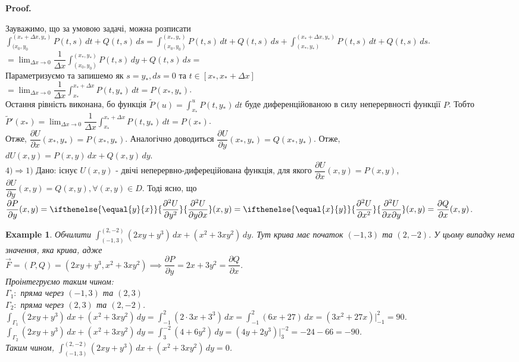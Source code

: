 \documentclass[a4paper, 10pt]{article}
\makeatletter
\def\departial#1#2{\dfrac{\partial {#1}}{\partial {#2}}}
\def\seconddepartial#1#2#3{\ifthenelse{\equal{#2}{#3}}{\dfrac{\partial^2 {#1}}{\partial {#2}^2}}{\dfrac{\partial^2 {#1}}{\partial {#2} \partial {#3}}}}
\def\qed{$\blacksquare$}
\theoremstyle{theoremdd}
\theoremstyle{theoremdd}
\theoremstyle{theoremdd}
\theoremstyle{theoremdd}
\theoremstyle{theoremdd}
\newtheorem{example}[theorem]{Example}
\theoremstyle{theoremdd}
\theoremstyle{theoremdd}
\theoremstyle{theoremdd}
\theoremstyle{theoremdd}
\theoremstyle{theoremdd}
\theoremstyle{theoremdd}
\theoremstyle{theoremdd}
\theoremstyle{theoremdd}
\theoremstyle{theoremdd}
\theoremstyle{theoremdd}
\renewenvironment{proof}[1][Proof.\\]{\par
\pushQED{\hfill \qed}%
\normalfont \topsep6\p@\@plus6\p@\relax
\trivlist
\item\relax
{\bfseries
#1\@addpunct{.}}\hspace\labelsep\ignorespaces
}{%
\popQED\endtrivlist\@endpefalse
}
\makeatother
\begin{document}
\begin{proof}
Зауважимо, що за умовою задачі, можна розписати \\ $\displaystyle\int_{(x_0,y_0}^{(x_*+\Delta x, y_*)}P(t,s)\,dt + Q(t,s)\,ds = \int_{(x_0,y_0)}^{(x_*, y_*)}P(t,s)\,dt + Q(t,s)\,ds + \int_{(x_*,y_*)}^{(x_*+\Delta x, y_*)}P(t,s)\,dt + Q(t,s)\,ds$.\\
$\boxed{=} \displaystyle\lim_{\Delta x \to 0} \dfrac{1}{\Delta x} \int_{(x_0,y_0)}^{(x_*,y_*)} P(t,s)\,dy + Q(t,s)\,ds \boxed{=}$\\
Параметризуємо та запишемо як $s = y_*, ds = 0$ та $t \in [x_*, x_*+\Delta x]$\\
$\boxed{=} \displaystyle\lim_{\Delta x \to 0} \dfrac{1}{\Delta x} \int_{x_*}^{x_*+\Delta x} P(t,y_*)\,dt = P(x_*,y_*)$.\\
Остання рівність виконана, бо функція $\tilde{P}(u) = \displaystyle\int_{x_*}^{u} P(t,y_*)\,dt$ буде диференційованою в силу неперервності функції $P$. Тобто $\tilde{P}'(x_*) = \displaystyle\lim_{\Delta x \to 0} \dfrac{1}{\Delta x} \int_{x_*}^{x_*+\Delta x} P(t,y_*)\,dt = P(x_*)$.\\
Отже, $\departial{U}{x}(x_*,y_*) = P(x_*,y_*)$. Аналогічно доводиться $\departial{U}{y}(x_*,y_*) = Q(x_*,y_*)$. Отже,\\
$dU(x,y) = P(x,y)\,dx + Q(x,y)\,dy$.
\bigskip \\
$\boxed{4) \Rightarrow 1)}$ Дано: існує $U(x,y)$ - двічі неперервно-дифереційована функція, для якого $\departial{U}{x}(x,y) = P(x,y)$, $\departial{U}{y}(x,y) = Q(x,y), \forall (x,y) \in D$. Тоді ясно, що\\
$\departial{P}{y}(x,y) = \seconddepartial{U}{y}{x}(x,y) = \seconddepartial{U}{x}{y}(x,y) = \departial{Q}{x}(x,y)$.
\end{proof}

\begin{example}
Обчилити $\displaystyle\int_{(-1,3)}^{(2,-2)} (2xy+y^3)\,dx + (x^2+3xy^2)\,dy$. Тут крива має початок $(-1,3)$ та $(2,-2)$. У цьому випадку нема значення, яка крива, адже\\
$\vec{F} = (P,Q) = (2xy+y^3, x^2+3xy^2) \implies \departial{P}{y} = 2x+3y^2 = \departial{Q}{x}$.\\
Проінтегруємо таким чином: \\
$\Gamma_1:$ пряма через $(-1,3)$ та $(2,3)$\\
$\Gamma_2:$ пряма через $(2,3)$ та $(2,-2)$.\\
$\displaystyle\int_{\Gamma_1} (2xy+y^3)\,dx + (x^2+3xy^2)\,dy = \int_{-1}^2 (2 \cdot 3x + 3^3)\,dx = \int_{-1}^2 (6x+27)\,dx = (3x^2+27x)\Big|_{-1}^2 = 90$.\\
$\displaystyle\int_{\Gamma_2} (2xy+y^3)\,dx + (x^2+3xy^2)\,dy = \int_{3}^{-2} (4+6y^2)\,dy = (4y+2y^3)\Big|_{3}^{-2} = -24 - 66 = -90$.\\
Таким чином, $\displaystyle\int_{(-1,3)}^{(2,-2)} (2xy+y^3)\,dx + (x^2+3xy^2)\,dy = 0$.
\end{example}
\newpage
\end{document}
